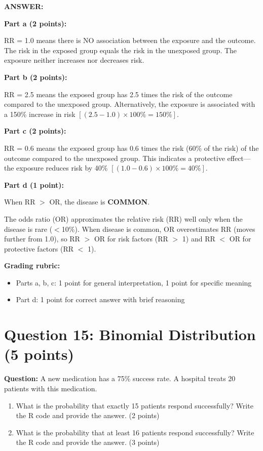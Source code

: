 \documentclass[11pt]{article}
\begin{document}
\textbf{ANSWER:}

\textbf{Part a (2 points):}

RR = 1.0 means there is NO association between the exposure and the outcome. The risk in the exposed group equals the risk in the unexposed group. The exposure neither increases nor decreases risk.

\textbf{Part b (2 points):}

RR = 2.5 means the exposed group has 2.5 times the risk of the outcome compared to the unexposed group. Alternatively, the exposure is associated with a 150\% increase in risk $[(2.5 - 1.0) \times 100\% = 150\%]$.

\textbf{Part c (2 points):}

RR = 0.6 means the exposed group has 0.6 times the risk (60\% of the risk) of the outcome compared to the unexposed group. This indicates a protective effect---the exposure reduces risk by 40\% $[(1.0 - 0.6) \times 100\% = 40\%]$.

\textbf{Part d (1 point):}

When RR $>$ OR, the disease is \textbf{COMMON}.

The odds ratio (OR) approximates the relative risk (RR) well only when the disease is rare ($<$10\%). When disease is common, OR overestimates RR (moves further from 1.0), so RR $>$ OR for risk factors (RR $>$ 1) and RR $<$ OR for protective factors (RR $<$ 1).

\textbf{Grading rubric:}
\begin{itemize}
    \item Parts a, b, c: 1 point for general interpretation, 1 point for specific meaning
    \item Part d: 1 point for correct answer with brief reasoning
\end{itemize}

\vspace{0.3cm}
\noindent\hrulefill

\section*{Question 15: Binomial Distribution (5 points)}

\textbf{Question:} A new medication has a 75\% success rate. A hospital treats 20 patients with this medication.

\begin{enumerate}
    \item[a)] What is the probability that exactly 15 patients respond successfully? Write the R code and provide the answer. (2 points)
    \item[b)] What is the probability that at least 16 patients respond successfully? Write the R code and provide the answer. (3 points)
\end{enumerate}
\end{document}
